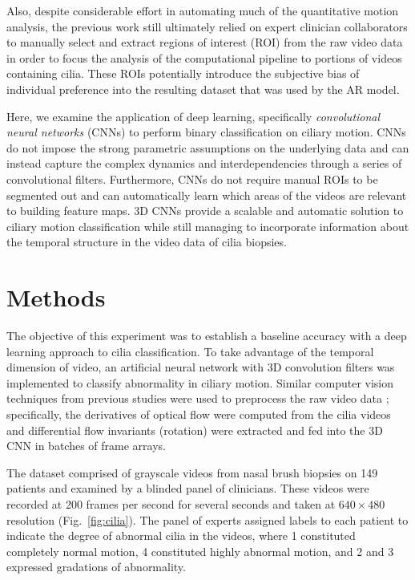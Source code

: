 Also, despite considerable effort in automating much of the quantitative motion analysis, the previous work still ultimately relied on expert clinician collaborators to manually select and extract regions of interest (ROI) from the raw video data in order to focus the analysis of the computational pipeline to portions of videos containing cilia. These ROIs potentially introduce the subjective bias of individual preference into the resulting dataset that was used by the AR model.

Here, we examine the application of deep learning, specifically \textit{convolutional neural networks} (CNNs) to perform binary classification on ciliary motion. CNNs do not impose the strong parametric assumptions on the underlying data and can instead capture the complex dynamics and interdependencies through a series of convolutional filters. Furthermore, CNNs do not require manual ROIs to be segmented out and can automatically learn which areas of the videos are relevant to building feature maps. 3D CNNs provide a scalable and automatic solution to ciliary motion classification while still managing to incorporate information about the temporal structure in the video data of cilia biopsies.

\section{Methods}

The objective of this experiment was to establish a baseline accuracy with a deep learning approach to cilia classification. To take advantage of the temporal dimension of video, an artificial neural network with 3D convolution filters was implemented to classify abnormality in ciliary motion. Similar computer vision techniques from previous studies were used to preprocess the raw video data   \cite{quinn2011novel}; specifically, the derivatives of optical flow were computed from the cilia videos and differential flow invariants (rotation) were extracted and fed into the 3D CNN in batches of frame arrays.

The dataset comprised of grayscale videos from nasal brush biopsies on 149 patients and examined by a blinded panel of clinicians. These videos were recorded at 200 frames per second for several seconds and taken at $640 \times 480$ resolution (Fig.~\ref{fig:cilia}). The panel of experts assigned labels to each patient to indicate the degree of abnormal cilia in the videos, where 1 constituted completely normal motion, 4 constituted highly abnormal motion, and 2 and 3 expressed gradations of abnormality. 

